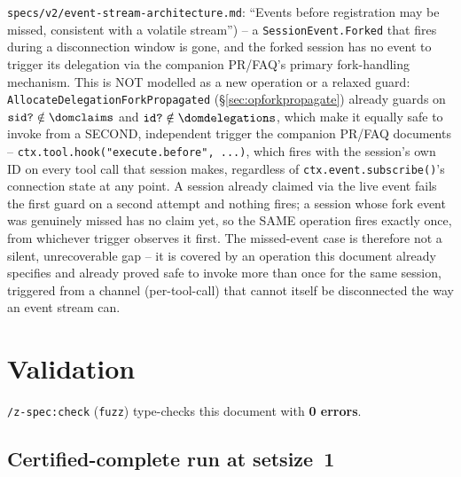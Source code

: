 \documentclass[a4paper,10pt,fleqn]{article}
\newcommand{\fpath}[1]{\texttt{#1}}
\newcommand{\field}[1]{\texttt{#1}}
\begin{document}
\begin{itemize}
    \fpath{specs/v2/event-stream-architecture.md}: ``Events before
    registration may be missed, consistent with a volatile stream'') --
    a \field{SessionEvent.Forked} that fires during a disconnection
    window is gone, and the forked session has no event to trigger its
    delegation via the companion PR/FAQ's primary fork-handling
    mechanism. This is NOT modelled as a new operation or a relaxed
    guard: \field{AllocateDelegationForkPropagated}
    (\S\ref{sec:opforkpropagate}) already guards on
    $\field{sid?} \notin \dom \field{claims}$ and
    $\field{id?} \notin \dom \field{delegations}$, which make it
    equally safe to invoke from a SECOND, independent trigger the
    companion PR/FAQ documents -- \field{ctx.tool.hook("execute.before", ...)},
    which fires with the session's own ID on every tool call that
    session makes, regardless of \field{ctx.event.subscribe()}'s
    connection state at any point. A session already claimed via the
    live event fails the first guard on a second attempt and nothing
    fires; a session whose fork event was genuinely missed has no claim
    yet, so the SAME operation fires exactly once, from whichever
    trigger observes it first. The missed-event case is therefore not a
    silent, unrecoverable gap -- it is covered by an operation this
    document already specifies and already proved safe to invoke more
    than once for the same session, triggered from a channel
    (per-tool-call) that cannot itself be disconnected the way an event
    stream can.
\end{itemize}

\section{Validation}
\label{sec:validation}

\texttt{/z-spec:check} (\texttt{fuzz}) type-checks this document with
\textbf{0 errors}.

\subsection{Certified-complete run at setsize~1}
\end{document}
